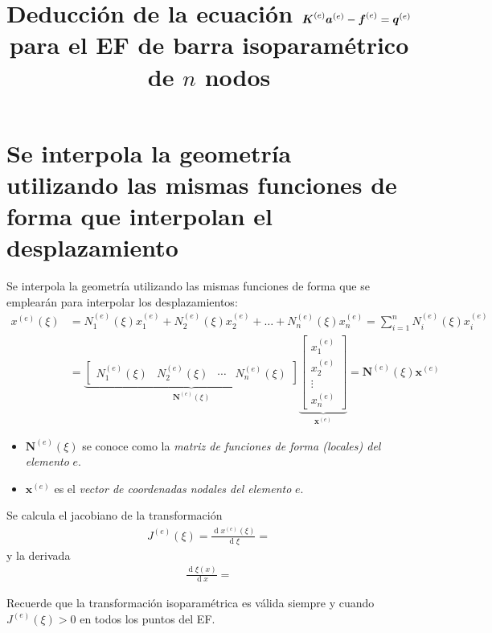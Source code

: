 \documentclass[12pt,letterpaper]{article}
\title{Deducción de la ecuación $\ma{K}^{(e)} \ve{a}^{(e)} - \ma{f}^{(e)} = \ma{q}^{(e)}$ para el EF de barra isoparamétrico de $n$ nodos}
\date{}
\newcommand{\ve}[1]{{\boldsymbol{#1}}}
\newcommand{\ma}[1]{{\boldsymbol{#1}}}
\newcommand{\dd}{\operatorname{d} \!}
\begin{document}
\maketitle

\section{Se interpola la geometría utilizando las mismas funciones de forma que interpolan el desplazamiento}

Se interpola la geometría utilizando las mismas funciones de forma que se emplearán para interpolar los desplazamientos:
\begin{align}
x^{(e)}(\xi) 
&= N_1^{(e)}(\xi) x_1^{(e)} + N_2^{(e)}(\xi) x_2^{(e)} + \ldots + N_n^{(e)}(\xi) x_n^{(e)} 
= \sum_{i=1}^n N_i^{(e)}(\xi) x_i^{(e)} \\
&= 
\underbrace{\begin{bmatrix}
    N_1^{(e)}(\xi) & N_2^{(e)}(\xi) & \cdots & N_n^{(e)}(\xi)
    \end{bmatrix}}_{\ma{N}^{(e)}(\xi)}
\underbrace{\begin{bmatrix}
    x_1^{(e)} \\ x_2^{(e)} \\ \vdots \\ x_n^{(e)}
    \end{bmatrix}}_{\ma{x}^{(e)}} = \ma{N}^{(e)}(\xi)  \ve{x}^{(e)}
\end{align}

\begin{itemize}
    \item $\ma{N}^{(e)}(\xi)$ se conoce como la \emph{matriz de funciones de forma (locales) del elemento} $e$.
    \item $\ve{x}^{(e)}$ es el \emph{vector de coordenadas nodales del elemento} $e$.
\end{itemize}    

Se calcula el jacobiano de la transformación
\begin{align}
J^{(e)}(\xi) = \frac{\dd x^{(e)}(\xi)}{\dd \xi} = 
\end{align}
y la derivada
\begin{align}
\frac{\dd \xi(x)}{\dd x} = 
\end{align}

Recuerde que la transformación isoparamétrica es válida siempre y cuando $J^{(e)}(\xi)>0$ en todos los puntos del EF.



\newpage
\end{document}
